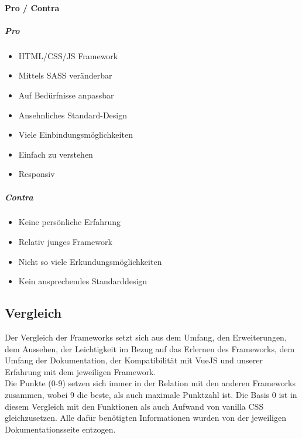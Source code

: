 		\paragraph{Pro / Contra}
		\subparagraph{Pro}
		\begin{itemize}
			\item HTML/CSS/JS Framework
			\item Mittels SASS veränderbar
			\item Auf Bedürfnisse anpassbar
			\item Ansehnliches Standard-Design 
			\item Viele Einbindungsmöglichkeiten
			\item Einfach zu verstehen
			\item Responsiv
		\end{itemize}
		\subparagraph{Contra}
		\begin{itemize}
			\item Keine persönliche Erfahrung
			\item Relativ junges Framework
			\item Nicht so viele Erkundungsmöglichkeiten
			\item Kein ansprechendes Standarddesign
		\end{itemize}

	\subsection{Vergleich}
	Der Vergleich der Frameworks setzt sich aus dem Umfang, den Erweiterungen, dem Aussehen, der Leichtigkeit im Bezug auf das Erlernen des Frameworks, dem Umfang der Dokumentation, der Kompatibilität mit VueJS und unserer Erfahrung mit dem jeweiligen Framework.\\
	Die Punkte (0-9) setzen sich immer in der Relation mit den anderen Frameworks zusammen, wobei 9 die beste, als auch maximale Punktzahl ist. Die Basis 0 ist in diesem Vergleich mit den Funktionen als auch Aufwand von vanilla CSS gleichzusetzen. Alle dafür benötigten Informationen wurden von der jeweiligen Dokumentationsseite entzogen.
